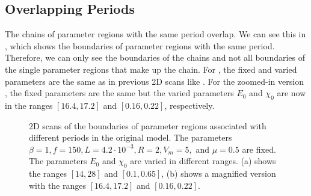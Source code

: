 \subsection{Overlapping Periods}

The chains of parameter regions with the same period overlap.
We can see this in , which shows the boundaries of parameter regions with the same period.
Therefore, we can only see the boundaries of the chains and not all boundaries of the single parameter regions that make up the chain.
For , the fixed and varied parameters are the same as in previous 2D scans like .
For the zoomed-in version , the fixed parameters are the same but the varied parameters $E_0$ and $\chi_0$ are now in the ranges $[16.4, 17.2]$ and $[0.16, 0.22]$, respectively.

\begin{figure}
	\centering
	\caption[2D scans of the boundaries of parameter regions associated with different periods in the original model]{
		2D scans of the boundaries of parameter regions associated with different periods in the original model.
		The parameters $\beta = 1, f = 150, L = 4.2 \cdot 10^{-3}, R = 2, V_m = 5,$ and $\mu = 0.5$ are fixed.
		The parameters $E_0$ and $\chi_0$ are varied in different ranges.
		(a) shows the ranges $[14, 28]$ and $[0.1, 0.65]$,
		(b) shows a magnified version with the ranges $[16.4, 17.2]$ and $[0.16, 0.22]$.
	}
	\label{fig:state.og.overlapping.chains}
\end{figure}

